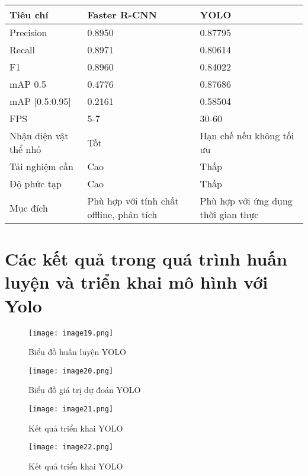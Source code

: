 \documentclass{article}
\begin{document}
\begin{center}
\begin{tabular}{|l|l|l|}
\hline
\textbf{Tiêu chí} & \textbf{Faster R-CNN} & \textbf{YOLO} \\ \hline
Precision         & 0.8950               & 0.87795       \\ \hline
Recall            & 0.8971               & 0.80614       \\ \hline
F1                & 0.8960               & 0.84022       \\ \hline
mAP 0.5           & 0.4776               & 0.87686       \\ \hline
mAP [0.5:0.95]    & 0.2161               & 0.58504       \\ \hline
FPS               & 5-7                  & 30-60         \\ \hline
Nhận diện vật thể nhỏ & Tốt                  & Hạn chế nếu không tối ưu \\ \hline
Tải nghiệm cần    & Cao                  & Thấp          \\ \hline
Độ phức tạp       & Cao                  & Thấp          \\ \hline
Mục đích          & Phù hợp với tính chất offline, phân tích & Phù hợp với ứng dụng thời gian thực \\ \hline
\end{tabular}
\end{center}

\section{Các kết quả trong quá trình huấn luyện và triển khai mô hình với Yolo}
\begin{figure}[h]
    \centering
    \texttt{[image: image19.png]}
    \caption{Biểu đồ huấn luyện YOLO}
\end{figure}

\begin{figure}[h]
    \centering
    \texttt{[image: image20.png]}
    \caption{Biểu đồ giá trị dự đoán YOLO}
\end{figure}

\begin{figure}[h]
    \centering
    \texttt{[image: image21.png]}
    \caption{Kết quả triển khai YOLO}
\end{figure}

\begin{figure}[h]
    \centering
    \texttt{[image: image22.png]}
    \caption{Kết quả triển khai YOLO}
\end{figure}
\end{document}
